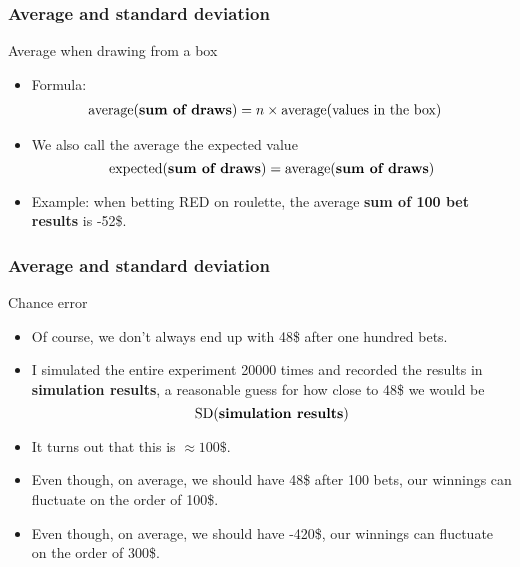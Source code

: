\documentclass[handout]{beamer}
\begin{document}

   \begin{frame} \frametitle{Average and standard deviation}

   \begin{block}
   {Average when drawing from a box}
   \begin{itemize}
     \item Formula:
   $$
   \begin{aligned}
     \text{average({\bf sum of draws})}
     &= n \times \text{average(values in the box)}
   \end{aligned}
   $$
   \item We also call the average the expected value
     $$
     \text{expected({\bf sum of draws})} = \text{average({\bf sum of draws})}
     $$
   \item Example: when betting {\color{red} RED} on roulette, the average
   {\bf sum of 100 bet results} is -52\$.

   \end{itemize}
   \end{block}
   \end{frame}


   \begin{frame} \frametitle{Average and standard deviation}

   \begin{block}
   {Chance error}
   \begin{itemize}
   \item Of course, we don't always end up with 48\$ after one hundred bets.
   \item I simulated the entire experiment 20000 times and recorded the results
   in {\bf simulation results},
   a reasonable guess for how close to 48\$ we would be
   $$
   \text{SD({\bf simulation results})}
   $$
   \item It turns out that this is $\approx 100 \$ $.

   \item Even though, on average, we should have 48\$ after 100 bets, our winnings
   can fluctuate on the order of 100\$.

   \item Even though, on average, we should have -420\$, our winnings
   can fluctuate on the order of 300\$.

   \end{itemize}
   \end{block}
   \end{frame}
\end{document}

